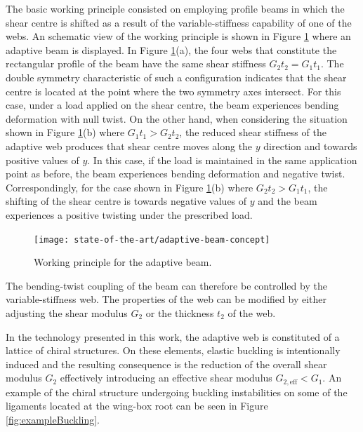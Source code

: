   The basic working principle consisted on employing profile beams in which the shear centre is shifted as a result of the variable-stiffness capability of one of the webs. An schematic view of the working principle is shown in Figure \ref{fig:adaptive-beam-concept} where an adaptive beam is displayed. In Figure \ref{fig:adaptive-beam-concept}(a), the four webs that constitute the rectangular profile of the beam have the same shear stiffness $G_2 t_2 = G_1 t_1$. The double symmetry characteristic of such a configuration indicates that the shear centre is located at the point where the two symmetry axes intersect. For this case, under a load applied on the shear centre, the beam experiences bending deformation with null twist. On the other hand, when considering the situation shown in Figure \ref{fig:adaptive-beam-concept}(b) where $G_1 t_1 > G_2 t_2$, the reduced shear stiffness of the adaptive web produces that shear centre moves along the $y$ direction and towards positive values of $y$. In this case, if the load is maintained in the same application point as before, the beam experiences bending deformation and negative twist. Correspondingly, for the case shown in Figure \ref{fig:adaptive-beam-concept}(b) where $G_2 t_2 > G_1 t_1$, the shifting of the shear centre is towards negative values of $y$ and the beam experiences a positive twisting under the prescribed load.

  \begin{figure}[!htpb]
    \centering
    \texttt{[image: state-of-the-art/adaptive-beam-concept]}
    \caption[Working principle for the adaptive beam]{Working principle for the adaptive beam. \cite{Raither2013}}\label{fig:adaptive-beam-concept}
  \end{figure}

  The bending-twist coupling of the beam can therefore be controlled by the variable-stiffness web. The properties of the web can be modified by either adjusting the shear modulus $G_2$ or the thickness $t_2$ of the web. 

  In the technology presented in this work, the adaptive web is constituted of a lattice of chiral structures. On these elements, elastic buckling is intentionally induced and the resulting consequence is the reduction of the overall shear modulus $G_2$ effectively introducing an effective shear modulus $G_{2,\mathrm{eff}} < G_1$. An example of the chiral structure undergoing buckling instabilities on some of the ligaments located at the wing-box root can be seen in Figure \ref{fig:exampleBuckling}.

